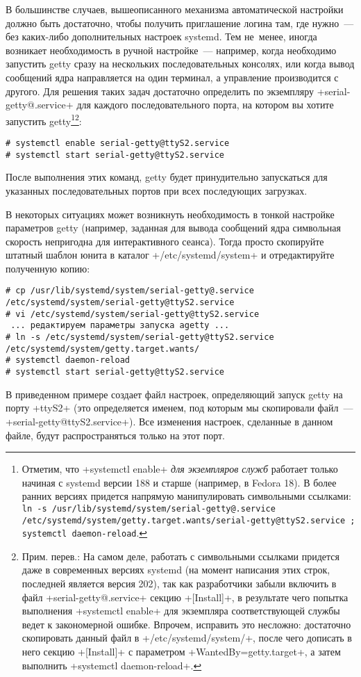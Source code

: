 \documentclass[10pt,oneside,a4paper]{article}
\begin{document}
В большинстве случаев, вышеописанного механизма автоматической настройки должно
быть достаточно, чтобы получить приглашение логина там, где нужно~--- без
каких-либо дополнительных настроек systemd. Тем не~менее, иногда возникает
необходимость в ручной настройке~--- например, когда необходимо запустить getty
сразу на нескольких последовательных консолях, или когда вывод сообщений ядра
направляется на один терминал, а управление производится с другого. Для решения
таких задач достаточно определить по экземпляру +serial-getty@.service+ для
каждого последовательного порта, на котором вы хотите запустить
getty\footnote{Отметим, что +systemctl enable+ \emph{для экземпляров служб}
работает только начиная с systemd версии 188 и старше (например, в Fedora 18). В
более ранних версиях придется напрямую манипулировать символьными ссылками:
\texttt{ln -s /usr/lib/systemd/system/serial-getty@.service
/etc/systemd/system/getty.target.wants/serial-getty@ttyS2.service ; systemctl
daemon-reload}.}\footnote{Прим. перев.: На самом деле, работать с символьными
ссылками придется даже в современных версиях systemd (на момент написания этих
строк, последней является версия 202), так как разработчики забыли включить в
файл +serial-getty@.service+ секцию +[Install]+, в результате чего попытка
выполнения +systemctl enable+ для экземпляра соответствующей службы ведет к
закономерной ошибке. Впрочем, исправить это несложно: достаточно скопировать
данный файл в +/etc/systemd/system/+, после чего дописать в него секцию
+[Install]+ с параметром +WantedBy=getty.target+, а затем выполнить 
+systemctl daemon-reload+.}:
\begin{Verbatim}
# systemctl enable serial-getty@ttyS2.service
# systemctl start serial-getty@ttyS2.service
\end{Verbatim}
После выполнения этих команд, getty будет принудительно запускаться для
указанных последовательных портов при всех последующих загрузках.

В некоторых ситуациях может возникнуть необходимость в тонкой настройке
параметров getty (например, заданная для вывода сообщений ядра символьная
скорость непригодна для интерактивного сеанса). Тогда просто скопируйте штатный
шаблон юнита в каталог +/etc/systemd/system+ и отредактируйте полученную копию:
\begin{Verbatim}
# cp /usr/lib/systemd/system/serial-getty@.service /etc/systemd/system/serial-getty@ttyS2.service
# vi /etc/systemd/system/serial-getty@ttyS2.service
 ... редактируем параметры запуска agetty ...
# ln -s /etc/systemd/system/serial-getty@ttyS2.service /etc/systemd/system/getty.target.wants/
# systemctl daemon-reload
# systemctl start serial-getty@ttyS2.service
\end{Verbatim}
В приведенном примере создает файл настроек, определяющий запуск getty на порту
+ttyS2+ (это определяется именем, под которым мы скопировали файл~---
+serial-getty@ttyS2.service+). Все изменения настроек, сделанные в данном файле,
будут распространяться только на этот порт.
\end{document}
